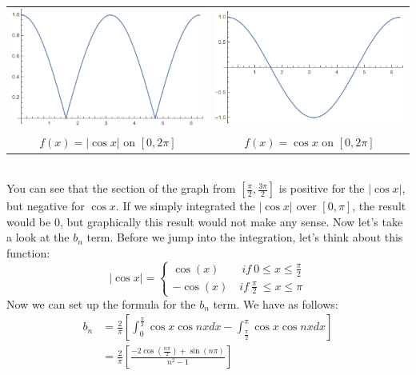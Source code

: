 \documentclass{article}
\begin{document}
\begin{center}
\begin{tabular}{c c}
\includegraphics[scale=0.5]{cos_abs} & \includegraphics[scale=0.5]{cos}\\
$f(x) = |\cos{x}|$ on $[0,2\pi]$ & $f(x) = \cos{x}$ on $[0,2\pi]$
\end{tabular}
\end{center}
\noindent\\ You can see that the section of the graph from $[\frac{\pi}{2},\frac{3 \pi}{2}]$ is positive for the $|\cos{x}|$, but negative for $\cos{x}$. If we simply integrated the $|\cos{x}|$ over $[0,\pi]$, the result would be 0, but graphically this result would not make any sense. Now let's take a look at the $b_{n}$ term. Before we jump into the integration, let's think about this function:
\[\left|\cos{x}\right| = 
\begin{cases*}
\cos(x) \qquad if\ 0\leq x \leq \frac{\pi}{2}\\
-\cos(x)\quad if\ \frac{\pi}{2}\ \leq x \leq \pi
\end{cases*}
\]
\noindent Now we can set up the formula for the $b_{n}$ term. We have as follows:
\begin{align*}
b_{n} &= \frac{2}{\pi}\left[ \int_{0}^{\frac{\pi}{2}} \cos{x}\cos{nx}dx - \int_{\frac{\pi}{2}}^{\pi} \cos{x}\cos{nx}dx \right]\\
&= \frac{2}{\pi} \left[ \frac{-2 \cos{\left(\frac{n\pi}{2}\right)} + \sin{\left(n\pi\right)}}{n^{2} - 1}\right]\\
\end{align*}
\end{document}
